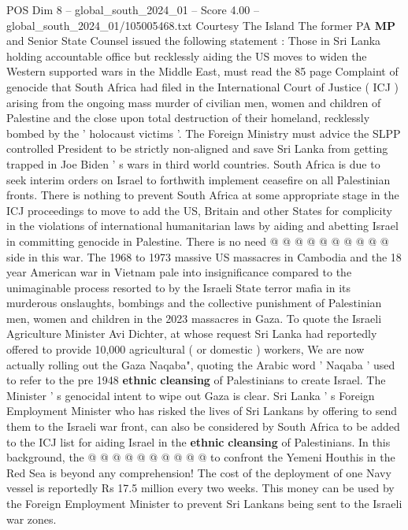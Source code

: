 \begin{textsample}{POS Dim 8 – global\_south\_2024\_01 – Score 4.00 – global\_south\_2024\_01/105005468.txt}  \label{ex:f8_pos_393}
Courtesy The Island The former PA \textbf{MP} and Senior State Counsel issued the following statement : Those in Sri Lanka holding accountable office but recklessly aiding the US moves to widen the Western supported wars in the Middle East, must read the 85 page Complaint of genocide that South Africa had filed in the International Court of Justice ( ICJ ) arising from the ongoing mass murder of civilian men, women and children of Palestine and the close upon total destruction of their homeland, recklessly bombed by the ' holocaust victims '.
The Foreign Ministry must advice the SLPP controlled President to be strictly non-aligned and save Sri Lanka from getting trapped in Joe Biden ' s wars in third world countries.
South Africa is due to seek interim orders on Israel to forthwith implement ceasefire on all Palestinian fronts.
There is nothing to prevent South Africa at some appropriate stage in the ICJ proceedings to move to add the US, Britain and other States for complicity in the violations of international humanitarian laws by aiding and abetting Israel in committing genocide in Palestine.
There is no need @ @ @ @ @ @ @ @ @ @ side in this war.
The 1968 to 1973 massive US massacres in Cambodia and the 18 year American war in Vietnam pale into insignificance compared to the unimaginable process resorted to by the Israeli State terror mafia in its murderous onslaughts, bombings and the collective punishment of Palestinian men, women and children in the 2023 massacres in Gaza.
To quote the Israeli Agriculture Minister Avi Dichter, at whose request Sri Lanka had reportedly offered to provide 10,000 agricultural ( or domestic ) workers, We are now actually rolling out the Gaza Naqaba", quoting the Arabic word ' Naqaba ' used to refer to the pre 1948 \textbf{ethnic} \textbf{cleansing} of Palestinians to create Israel.
The Minister ' s genocidal intent to wipe out Gaza is clear.
Sri Lanka ' s Foreign Employment Minister who has risked the lives of Sri Lankans by offering to send them to the Israeli war front, can also be considered by South Africa to be added to the ICJ list for aiding Israel in the \textbf{ethnic} \textbf{cleansing} of Palestinians.
In this background, the @ @ @ @ @ @ @ @ @ @ to confront the Yemeni Houthis in the Red Sea is beyond any comprehension!
The cost of the deployment of one Navy vessel is reportedly Rs 17.5 million every two weeks.
This money can be used by the Foreign Employment Minister to prevent Sri Lankans being sent to the Israeli war zones.

\end{textsample}
